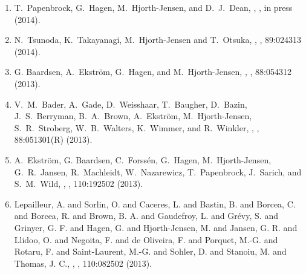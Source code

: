 \documentclass[prc,amsart,english,twocolumn,superscriptaddress,showpacs,floatfix]{revtex4}
\begin{document}
\begin{enumerate}
\item  T.~Papenbrock, G.~Hagen, M.~Hjorth-Jensen, and  D.~J.~Dean, 
, 
,  in press (2014).


\item N.~Tsunoda, K.~Takayanagi, M.~Hjorth-Jensen and T.~Otsuka,
, 
,    89:024313 (2014).


\item G. Baardsen, A.\ Ekstr\"om, G.\ Hagen, and M.\ Hjorth-Jensen,
, 
, 88:054312 (2013).


\item V.\ M.\ Bader, A.\ Gade, D.\ Weisshaar, T.\ Baugher, D.\ Bazin, J.\ S.\ Berryman, B.\ A.\ Brown, A.\ Ekstr\"om, M.\ Hjorth-Jensen, S.\ R.\ Stroberg, W.\ B.\ Walters, K.\ Wimmer, and R.\ Winkler, 
, 
,  88:051301(R) (2013).

\item  A.~Ekstr\"om, G. Baardsen, C.~Forss\'en, G.~Hagen, M.~Hjorth-Jensen, G.~R.~Jansen, R.~Machleidt, W.~Nazarewicz, T.~Papenbrock, J.~Sarich, and S.~M.~Wild, 
, 
,  110:192502 (2013).


\item Lepailleur, A. and Sorlin, O. and Caceres, L. and Bastin, B. and Borcea, C. and Borcea, R. and Brown, B. A. and Gaudefroy, L. and Gr\'evy, S. and Grinyer, G. F. and Hagen, G. and Hjorth-Jensen, M. and Jansen, G. R. and Llidoo, O. and Negoita, F. and de Oliveira, F. and Porquet, M.-G. and Rotaru, F. and Saint-Laurent, M.-G. and Sohler, D. and Stanoiu, M. and Thomas, J. C.,
, 
,  110:082502 (2013).

 \end{enumerate}
\end{document}
